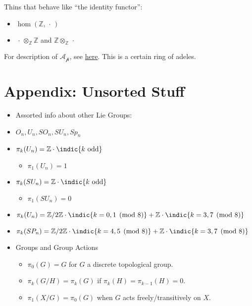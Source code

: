 Thins that behave like ``the identity functor'':

\begin{itemize}
\tightlist
\item
  \(\hom({\mathbb{Z}}, {\,\cdot\,})\)
\item
  \({\,\cdot\,}\otimes_{\mathbb{Z}}{\mathbb{Z}}\) and
  \({\mathbb{Z}}\otimes_{\mathbb{Z}}{\,\cdot\,}\)
\end{itemize}

For description of \(\mathcal{A_p}\), see
\href{http://math.jhu.edu/~jmb/note/torext.pdf}{here}. This is a certain
ring of adeles.

\hypertarget{appendix-unsorted-stuff}{%
\section{Appendix: Unsorted Stuff}\label{appendix-unsorted-stuff}}

\begin{itemize}
\item
  Assorted info about other Lie Groups:
\item
  \(O_n, U_n, SO_n, SU_n, Sp_n\)
\item
  \(\pi_k(U_n) = {\mathbb{Z}}\cdot\indic{k~\text{odd}}\)

  \begin{itemize}
  \tightlist
  \item
    \(\pi_1(U_n) = 1\)
  \end{itemize}
\item
  \(\pi_k(SU_n) = {\mathbb{Z}}\cdot\indic{k~\text{odd}}\)

  \begin{itemize}
  \tightlist
  \item
    \(\pi_1(SU_n) = 0\)
  \end{itemize}
\item
  \(\pi_k(U_n) = {\mathbb{Z}}/2{\mathbb{Z}}\cdot\indic{k = 0,1\pmod 8} + {\mathbb{Z}}\cdot\indic{k = 3,7 \pmod 8}\)
\item
  \(\pi_k(SP_n) = {\mathbb{Z}}/2{\mathbb{Z}}\cdot\indic{k = 4,5\pmod 8} + {\mathbb{Z}}\cdot\indic{k = 3,7 \pmod 8}\)
\item
  Groups and Group Actions

  \begin{itemize}
  \tightlist
  \item
    \(\pi_0(G) = G\) for \(G\) a discrete topological group.
  \item
    \(\pi_k(G/H) = \pi_k(G)\) if \(\pi_k(H) = \pi_{k-1}(H) = 0\).
  \item
    \(\pi_1(X/G) = \pi_0(G)\) when \(G\) acts freely/transitively on
    \(X\).
  \end{itemize}
\end{itemize}

